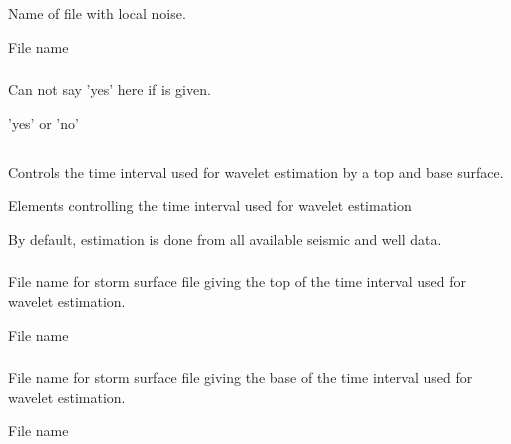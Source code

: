 \subsubsection{}
 \slist
   \item \Description Name of file with local noise.
   \item \Argument File name
   \item \Default
 \elist

\subsubsection{}
 \slist
   \item \Description Can not say 'yes' here if  is given.
   \item \Argument 'yes' or 'no'
   \item \Default
 \elist

\subsection{}
 \slist
   \item \Description Controls the time interval used for wavelet estimation by a top and base surface.
   \item \Argument Elements controlling the time interval used for wavelet estimation
   \item \Default By default, estimation is done from all available seismic and well data.
 \elist

\subsubsection{}
 \slist
   \item \Description File name for storm surface file giving the top of the time interval used for wavelet estimation.
   \item \Argument File name
   \item \Default
 \elist

\subsubsection{}
 \slist
   \item \Description File name for storm surface file giving the base of the time interval used for wavelet estimation.
   \item \Argument File name
   \item \Default
 \elist

